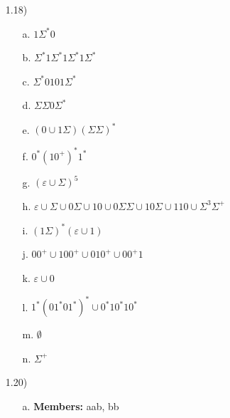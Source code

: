\documentclass[12pt]{letter}
\begin{document}
\begin{itemize}
\begin{itemize}
\begin{tikzpicture}[>=stealth',shorten >=1pt,auto,node distance=10mm]
        \end{tikzpicture}

    \end{itemize}

    \item [1.18)]

    \begin{itemize}

        \item [a.] $1\Sigma^*0$

        \item [b.] $\Sigma^*1\Sigma^*1\Sigma^*1\Sigma^*$

        \item [c.] $\Sigma^*0101\Sigma^*$

        \item [d.] $\Sigma\Sigma0\Sigma^*$

        \item [e.] $(0\cup1\Sigma)(\Sigma\Sigma)^*$

        \item [f.] $0^*(10^+)^*1^*$

        \item [g.] $(\varepsilon\cup\Sigma)^5$

        \item [h.] $\varepsilon\cup\Sigma\cup0\Sigma\cup10\cup0\Sigma\Sigma\cup10\Sigma\cup110\cup\Sigma^3\Sigma^+$

        \item [i.] $(1\Sigma)^*(\varepsilon\cup1)$

        \item [j.] $00^+\cup100^+\cup010^+\cup00^+1$

        \item [k.] $\varepsilon\cup0$

        \item [l.] $1^*(01^*01^*)^*\cup0^*10^*10^*$

        \item [m.] $\emptyset$

        \item [n.] $\Sigma^+$

    \end{itemize} \newpage

    \item [1.20)]

    \begin{itemize}

        \item [a.] \textbf{Members:} aab, bb\\


\end{itemize}
\end{itemize}
\end{document}
